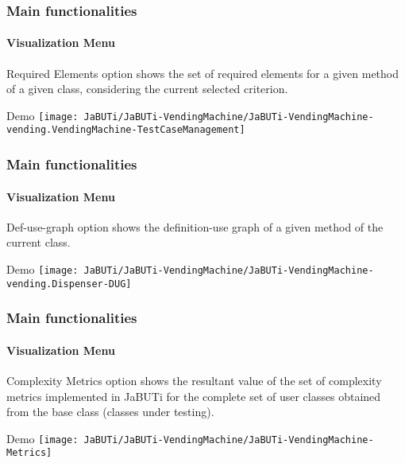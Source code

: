 \begin{frame}
\frametitle{Main functionalities}
\framesubtitle{Visualization Menu}
\label{concept:required-elements}

\begin{block}{Required Elements}
 option shows the set of required elements for a
given method of a given class, considering the current selected criterion.
\end{block}

\begin{block}{Demo}
\texttt{[image: JaBUTi/JaBUTi-VendingMachine/JaBUTi-VendingMachine-vending.VendingMachine-TestCaseManagement]}
\end{block}
\end{frame}



\begin{frame}
\frametitle{Main functionalities}
\framesubtitle{Visualization Menu}
\label{concept:def-use-graph}

\begin{block}{Def-use-graph}
 option shows the definition-use graph of a given
method of the current class.
\end{block}

\begin{block}{Demo}
\texttt{[image: JaBUTi/JaBUTi-VendingMachine/JaBUTi-VendingMachine-vending.Dispenser-DUG]}
\end{block}
\end{frame}



\begin{frame}
\frametitle{Main functionalities}
\framesubtitle{Visualization Menu}
\label{concept:complexity-metrics}

\begin{block}{Complexity Metrics}
 option shows the resultant value of the set of
complexity metrics implemented in JaBUTi for the complete set of user classes
obtained from the base class (classes under testing).
\end{block}

\begin{block}{Demo}
\texttt{[image: JaBUTi/JaBUTi-VendingMachine/JaBUTi-VendingMachine-Metrics]}
\end{block}
\end{frame}
